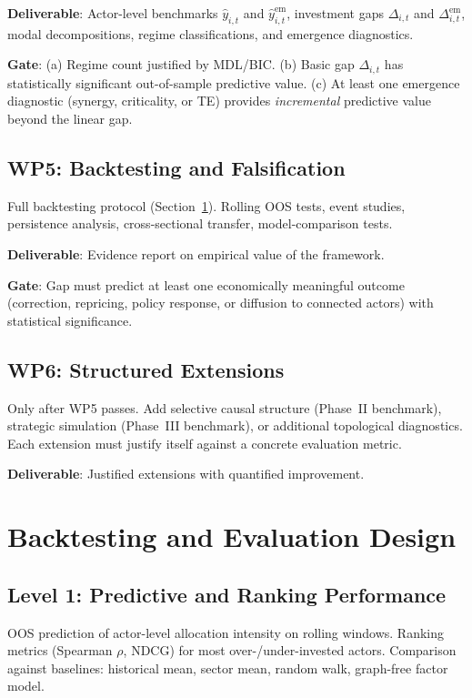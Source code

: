 \documentclass[11pt,a4paper]{article}
\theoremstyle{definition}
\begin{document}
\textbf{Deliverable}: Actor-level benchmarks $\hat{y}_{i,t}$ and $\hat{y}_{i,t}^{\mathrm{em}}$, investment gaps $\Delta_{i,t}$ and $\Delta_{i,t}^{\mathrm{em}}$, modal decompositions, regime classifications, and emergence diagnostics.

\textbf{Gate}: (a) Regime count justified by MDL/BIC. (b) Basic gap $\Delta_{i,t}$ has statistically significant out-of-sample predictive value. (c) At least one emergence diagnostic (synergy, criticality, or TE) provides \emph{incremental} predictive value beyond the linear gap.

\subsection{WP5: Backtesting and Falsification}
Full backtesting protocol (Section~\ref{sec:backtest}). Rolling OOS tests, event studies, persistence analysis, cross-sectional transfer, model-comparison tests.

\textbf{Deliverable}: Evidence report on empirical value of the framework.

\textbf{Gate}: Gap must predict at least one economically meaningful outcome (correction, repricing, policy response, or diffusion to connected actors) with statistical significance.

\subsection{WP6: Structured Extensions}
Only after WP5 passes. Add selective causal structure (Phase~II benchmark), strategic simulation (Phase~III benchmark), or additional topological diagnostics. Each extension must justify itself against a concrete evaluation metric.

\textbf{Deliverable}: Justified extensions with quantified improvement.


\section{Backtesting and Evaluation Design}
\label{sec:backtest}

\subsection{Level 1: Predictive and Ranking Performance}
OOS prediction of actor-level allocation intensity on rolling windows. Ranking metrics (Spearman $\rho$, NDCG) for most over-/under-invested actors. Comparison against baselines: historical mean, sector mean, random walk, graph-free factor model.
\end{document}
